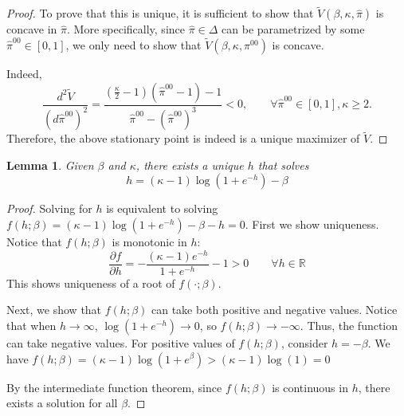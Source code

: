 \documentclass[12pt]{article}
\newtheorem{lemma}[theorem]{Lemma}
\numberwithin{equation}{section}
\begin{document}
\begin{proof}
    To prove that this is unique, it is sufficient to show that $\tilde{V}(\beta, \kappa, \widehat{\pi})$ is concave in $\widehat{\pi}$.
    More specifically, since $\widehat{\pi}\in\Delta$ can be parametrized by some $\widehat{\pi}^{00}\in[0, 1]$,
    we only need to show that $\widetilde{V}(\beta, \kappa, \pi^{00})$ is concave.

    Indeed,
    \begin{equation*}
        \frac{d^2\widetilde{V}}{(d\widehat{\pi}^{00})^2} = \frac{\left(\frac\kappa2-1\right)(\widehat{\pi}^{00} - 1) - 1}{\widehat{\pi}^{00} - (\widehat{\pi}^{00})^3} < 0, \qquad \forall \widehat{\pi}^{00}\in[0, 1], \kappa \geq 2.
    \end{equation*}
    Therefore, the above stationary point is indeed is a unique maximizer of $\widetilde{V}$.

\end{proof}

\begin{lemma}
    Given $\beta$ and $\kappa$, there exists a unique $h$ that solves
    \begin{equation*}
        h = (\kappa - 1)\log (1+e^{-h}) - \beta
    \end{equation*}
\end{lemma}

\begin{proof}
    Solving for $h$ is equivalent to solving $f(h; \beta) = (\kappa - 1)\log (1+e^{-h}) - \beta - h = 0$.
    First we show uniqueness. Notice that $f(h; \beta)$ is monotonic in $h$:
    \begin{equation*}
        \frac{\partial f}{\partial h} = -\frac{(\kappa - 1)e^{-h}}{1+e^{-h}} - 1 > 0 \qquad \forall h\in \mathbb{R}
    \end{equation*}
    This shows uniqueness of a root of $f(\cdot; \beta)$.

    Next, we show that $f(h; \beta)$ can take both positive and negative values. Notice that when
    $h\rightarrow \infty$, $\log (1+e^{-h}) \rightarrow 0$, so $f(h; \beta) \rightarrow -\infty$. Thus, the function can take negative values.
    For positive values of $f(h; \beta)$, consider $h = -\beta$. We have $f(h; \beta) = (\kappa - 1)\log (1+e^\beta) > (\kappa - 1)\log(1) = 0$

    By the intermediate function theorem, since $f(h; \beta)$ is continuous in $h$, there exists a solution for all $\beta$.

\end{proof}
\end{document}
